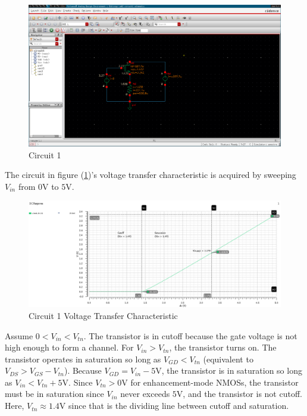 
\FloatBarrier

\begin{figure}[h!]
	\centering
	\includegraphics[scale=0.75]{../images/circuit1.PNG}
	\caption{Circuit 1}
	\label{fig:circuit1}
\end{figure}

\FloatBarrier

The circuit in figure (\ref{fig:circuit1})'s voltage transfer characteristic is acquired by sweeping $V_{in}$ from $0$\si{\volt} to $5$\si{\volt}.

\FloatBarrier

\begin{figure}[h!]
	\centering
	\includegraphics[scale=0.75]{../images/sim1_vtc.PNG}
	\caption{Circuit 1 Voltage Transfer Characteristic}
	\label{fig:sim1_vtc}
\end{figure}

\FloatBarrier
Assume $0 < V_{in} < V_{tn}$.
The transistor is in cutoff because the gate voltage is not high enough to form a channel.
For $V_{in} > V_{tn}$, the transistor turns on.
The transistor operates in saturation so long as $V_{GD} < V_{tn}$ (equivalent to $V_{DS} > V_{GS} - V_{tn}$).
Because $V_{GD} = V_{in} - 5$\si{\volt}, the transistor is in saturation so long as $V_{in} < V_{tn} + 5$\si{\volt}.
Since $V_{tn} > 0$\si{\volt} for enhancement-mode NMOSs, the transistor must be in saturation since $V_{in}$ never exceeds $5$\si{\volt}, and the transistor is not cutoff.
Here, $V_{tn} \approx 1.4$\si{\volt} since that is the dividing line between cutoff and saturation. \\

